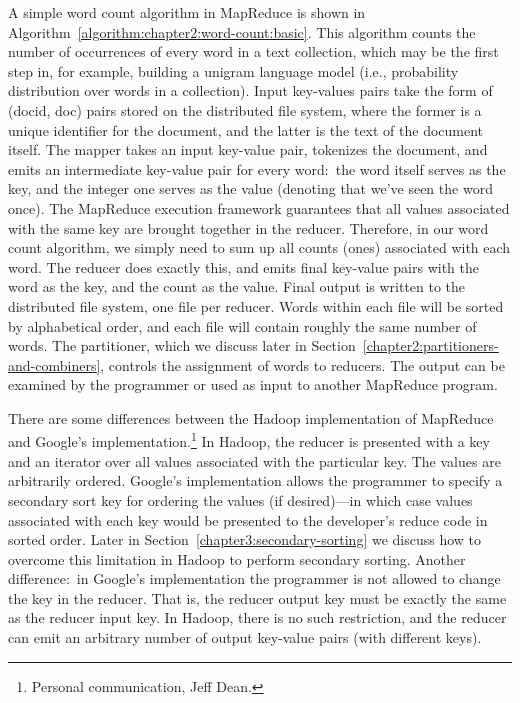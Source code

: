 \documentclass[11pt]{article}
\begin{document}
A simple word count algorithm in MapReduce is shown in
Algorithm~\ref{algorithm:chapter2:word-count:basic}.  This algorithm counts the
number of occurrences of every word in a text collection, which may be
the first step in, for example, building a unigram language model
(i.e., probability distribution over words in a collection).  Input
key-values pairs take the form of (docid, doc) pairs stored on the
distributed file system, where the former is a unique identifier for
the document, and the latter is the text of the document itself.  The
mapper takes an input key-value pair, tokenizes the document, and
emits an intermediate key-value pair for every word:\ the word itself
serves as the key, and the integer one serves as the value (denoting
that we've seen the word once).  The MapReduce execution framework
guarantees that all values associated with the same key are brought
together in the reducer.  Therefore, in our word count algorithm, we
simply need to sum up all counts (ones) associated with each word.
The reducer does exactly this, and emits final key-value pairs with
the word as the key, and the count as the value.  Final output is
written to the distributed file system, one file per reducer.  Words
within each file will be sorted by alphabetical order, and each file
will contain roughly the same number of words.  The partitioner, which
we discuss later in Section~\ref{chapter2:partitioners-and-combiners},
controls the assignment of words to reducers.  The output can be
examined by the programmer or used as input to another MapReduce
program.

There are some differences between the Hadoop implementation of
MapReduce and Google's implementation.\footnote{Personal
communication, Jeff Dean.}  In Hadoop, the reducer is presented with a
key and an iterator over all values associated with the particular
key.  The values are arbitrarily ordered.  Google's implementation
allows the programmer to specify a secondary sort key for ordering the
values (if desired)---in which case values associated with each key
would be presented to the developer's reduce code in sorted order.
Later in Section~\ref{chapter3:secondary-sorting} we discuss how to
overcome this limitation in Hadoop to perform secondary sorting.
Another difference:\ in Google's implementation the programmer is not
allowed to change the key in the reducer.  That is, the reducer output
key must be exactly the same as the reducer input key.  In Hadoop,
there is no such restriction, and the reducer can emit an arbitrary
number of output key-value pairs (with different keys).
\end{document}
